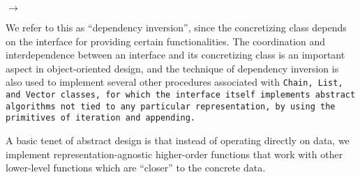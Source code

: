 \begin{center}
$\longrightarrow$
\end{center}

We refer to this as ``dependency inversion'', since the concretizing
class depends on the interface for providing certain functionalities.
The coordination and interdependence between an interface and its concretizing
class is an important aspect in object-oriented design, and the technique
of dependency inversion is also used to implement several other procedures
associated with \tt{Chain}, \tt{List}, and \tt{Vector} classes, for which the
interface itself implements abstract algorithms not tied to any particular
representation, by using the primitives of iteration and appending.

\note A basic tenet of abstract design is that instead of operating directly
on data, we implement representation-agnostic higher-order functions that work
with other lower-level functions which are ``closer'' to the concrete data.

